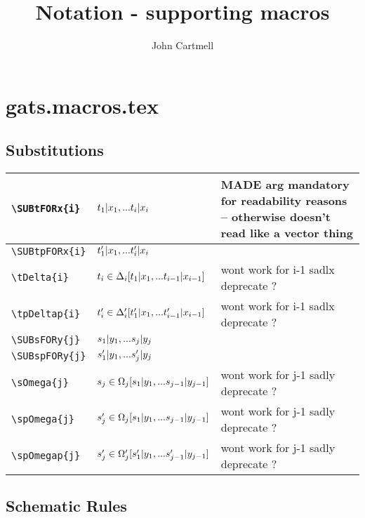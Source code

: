 \documentclass[10pt,a4paper]{article}
\title{Notation - supporting macros}
\author{John Cartmell}
\begin{document}
\maketitle

\section{gats.macros.tex}

\subsection{Substitutions}
\begin{tabular}{| l | l |p{5cm}|}
\hline
\verb'\SUBtFORx{i}' & $t_1|x_1,...t_{i}|x_{i}$ & MADE arg mandatory for readability reasons -- otherwise doesn't read like a vector thing \\   
\hline
\verb'\SUBtpFORx{i}' & $t'_1|x_1,...t'_{i}|x_{i}$ & \\
\hline 
\verb'\tDelta{i}' & $t_{i} \in \Delta_{i}[t_1|x_1,...t_{i-1}|x_{i-1}]$ & wont work for i-1 sadlx deprecate ?\\
\hline 
\verb'\tpDeltap{i}' & $t'_{i} \in \Delta'_{i}[t'_1|x_1,...t'_{i-1}|x_{i-1}]$ & wont work for i-1 sadlx deprecate ?\\
\hline
\verb'\SUBsFORy{j}' & $s_1|y_1,...s_{j}|y_{j}$ & \\
\hline
\verb'\SUBspFORy{j}' & $s'_1|y_1,...s'_{j}|y_{j}$ & \\
\hline 
\verb'\sOmega{j}' & $s_{j} \in \Omega_{j}[s_1|y_1,...s_{j-1}|y_{j-1}]$ & wont work for j-1 sadly deprecate ? \\
\hline 
\verb'\spOmega{j}' & $s'_{j} \in \Omega_{j}[s_1|y_1,...s_{j-1}|y_{j-1}]$ & wont work for j-1 sadly deprecate ? \\
\hline 
\verb'\spOmegap{j}' & $s'_{j} \in \Omega'_{j}[s'_1|y_1,...s'_{j-1}|y_{j-1}]$ & wont work for j-1 sadly deprecate ?\\
\hline
\end{tabular}
\newpage
\subsection{Schematic Rules}
\end{document}

